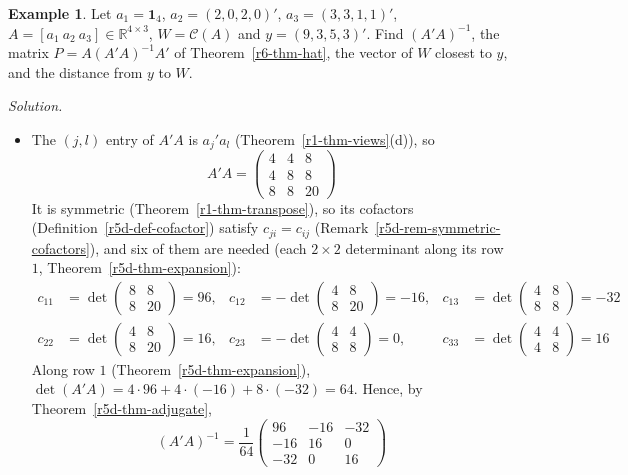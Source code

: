 \documentclass[12pt]{article}
\newcommand{\R}{\mathbb R}
\newcommand{\one}{\mathbf 1}
\theoremstyle{definition}
\newtheorem{example}[theorem]{Example}
\begin{document}
\begin{example}\label{r6-exm-projection}
Let \(a_1=\one_4\), \(a_2=(2,0,2,0)'\), \(a_3=(3,3,1,1)'\), \(A=[a_1\ a_2\ a_3]\in\R^{4\times3}\), \(W=\mathcal C(A)\) and
\(y=(9,3,5,3)'\). Find \((A'A)^{-1}\), the matrix \(P=A(A'A)^{-1}A'\) of Theorem~\ref{r6-thm-hat}, the vector of \(W\)
closest to \(y\), and the distance from \(y\) to \(W\).

\textit{Solution.}
\begin{itemize}
\item The \((j,l)\) entry of \(A'A\) is \(a_j'a_l\) (Theorem~\ref{r1-thm-views}(d)), so
\[
A'A=\begin{pmatrix}4&4&8\\4&8&8\\8&8&20\end{pmatrix}
\]
It is symmetric (Theorem~\ref{r1-thm-transpose}), so its cofactors (Definition~\ref{r5d-def-cofactor}) satisfy \(c_{ji}=c_{ij}\)
(Remark~\ref{r5d-rem-symmetric-cofactors}), and six of them are needed (each \(2\times2\) determinant along its
row \(1\), Theorem~\ref{r5d-thm-expansion}):
\[
\begin{aligned}
c_{11}&=\det\begin{pmatrix}8&8\\8&20\end{pmatrix}=96,&
c_{12}&=-\det\begin{pmatrix}4&8\\8&20\end{pmatrix}=-16,&
c_{13}&=\det\begin{pmatrix}4&8\\8&8\end{pmatrix}=-32\\
c_{22}&=\det\begin{pmatrix}4&8\\8&20\end{pmatrix}=16,&
c_{23}&=-\det\begin{pmatrix}4&4\\8&8\end{pmatrix}=0,&
c_{33}&=\det\begin{pmatrix}4&4\\4&8\end{pmatrix}=16
\end{aligned}
\]
Along row \(1\) (Theorem~\ref{r5d-thm-expansion}), \(\det(A'A)=4\cdot96+4\cdot(-16)+8\cdot(-32)=64\). Hence, by
Theorem~\ref{r5d-thm-adjugate},
\[
(A'A)^{-1}=\frac1{64}\begin{pmatrix}96&-16&-32\\-16&16&0\\-32&0&16\end{pmatrix}
\]
\end{itemize}
\end{example}
\end{document}
